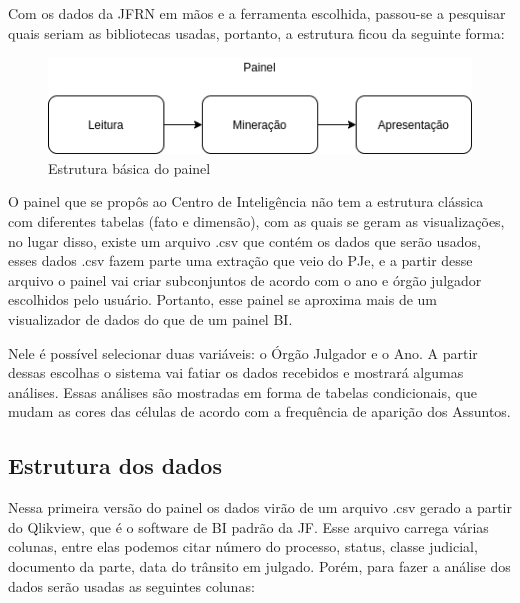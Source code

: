 Com os dados da JFRN em mãos e a ferramenta escolhida, passou-se a pesquisar quais seriam as bibliotecas usadas, portanto, a estrutura ficou da seguinte forma:

\begin{figure}[h]
	\centering
	\includegraphics[scale=0.65]{./figures/cap2/estrutura_painel.png}
	\caption{Estrutura básica do painel}
\end{figure}

O painel que se propôs ao Centro de Inteligência não tem a estrutura clássica com diferentes tabelas (fato e dimensão), com as quais se geram as visualizações, no lugar disso, existe um arquivo .csv que contém os dados que serão usados, esses dados .csv fazem parte uma extração que veio do PJe, e a partir desse arquivo o painel vai criar subconjuntos de acordo com o ano e órgão julgador escolhidos pelo usuário. Portanto, esse painel se aproxima mais de um visualizador de dados do que de um painel BI.

Nele é possível selecionar duas variáveis: o Órgão Julgador e o Ano. A partir dessas escolhas o sistema vai fatiar os dados recebidos e mostrará algumas análises. Essas análises são mostradas em forma de tabelas condicionais, que mudam as cores das células de acordo com a frequência de aparição dos Assuntos.

\subsection{Estrutura dos dados}

Nessa primeira versão do painel os dados virão de um arquivo .csv gerado a partir do Qlikview, que é o software de BI padrão da JF. Esse arquivo carrega várias colunas, entre elas podemos citar número do processo, status, classe judicial, documento da parte, data do trânsito em julgado. Porém, para fazer a análise dos dados serão usadas as seguintes colunas:

